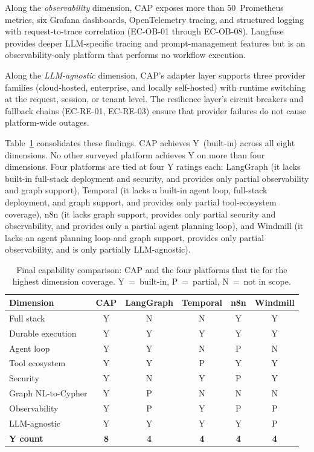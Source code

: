 \documentclass[a4paper,noexaminfo]{sapthesis}
\begin{document}
Along the \emph{observability} dimension, CAP exposes more than
50~Prometheus metrics, six Grafana dashboards, OpenTelemetry tracing,
and structured logging with request-to-trace correlation (EC-OB-01
through EC-OB-08).  Langfuse provides deeper LLM-specific tracing and
prompt-management features but is an observability-only platform that
performs no workflow execution.

Along the \emph{LLM-agnostic} dimension, CAP's adapter layer supports
three provider families (cloud-hosted, enterprise, and locally
self-hosted) with runtime switching at the request, session, or tenant
level.  The resilience layer's circuit breakers and fallback chains
(EC-RE-01, EC-RE-03) ensure that provider failures do not cause
platform-wide outages.

Table~\ref{tab:final-comparison} consolidates these findings.  CAP
achieves Y~(built-in) across all eight dimensions.  No other surveyed
platform achieves Y on more than four dimensions.  Four platforms are
tied at four Y ratings each: LangGraph (it lacks built-in full-stack
deployment and security, and provides only partial observability and
graph support), Temporal (it lacks a built-in agent loop, full-stack
deployment, and graph support, and provides only partial tool-ecosystem
coverage), n8n (it lacks graph support, provides only partial
security and observability, and provides only a partial agent planning
loop), and Windmill (it lacks an agent planning loop and graph
support, provides only partial observability, and is only partially
LLM-agnostic).

\begin{table}[ht]
\centering
\caption{Final capability comparison: CAP and the four platforms that
tie for the highest dimension coverage.  Y~=~built-in, P~=~partial,
N~=~not in scope.}
\label{tab:final-comparison}
\small
\begin{tabular}{lccccc}
    \hline
    \textbf{Dimension} & \textbf{CAP} & \textbf{LangGraph} &
        \textbf{Temporal} & \textbf{n8n} & \textbf{Windmill} \\
    \hline
    Full stack         & Y & N & N & Y & Y \\
    Durable execution  & Y & Y & Y & Y & Y \\
    Agent loop         & Y & Y & N & P & N \\
    Tool ecosystem     & Y & Y & P & Y & Y \\
    Security           & Y & N & Y & P & Y \\
    Graph NL-to-Cypher & Y & P & N & N & N \\
    Observability      & Y & P & Y & P & P \\
    LLM-agnostic       & Y & Y & Y & Y & P \\
    \hline
    \textbf{Y count}   & \textbf{8} & \textbf{4} & \textbf{4} &
        \textbf{4} & \textbf{4} \\
    \hline
\end{tabular}
\end{table}
\end{document}
